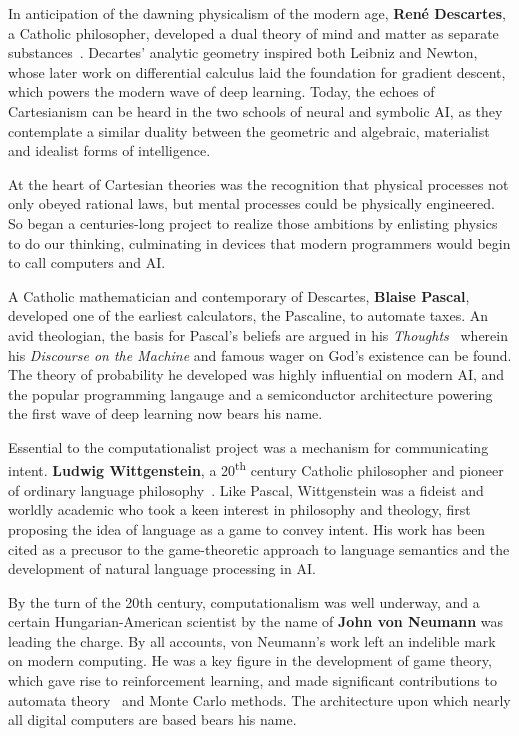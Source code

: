 \documentclass[sigplan,nonacm]{acmart}\settopmatter{printfolios=false,printccs=false,printacmref=false}
\begin{document}
  In anticipation of the dawning physicalism of the modern age, \textbf{Ren\'e Descartes}, a Catholic philosopher, developed a dual theory of mind and matter as separate substances~\cite{descartes1641meditationes}. Decartes' analytic geometry inspired both Leibniz and Newton, whose later work on differential calculus laid the foundation for gradient descent, which powers the modern wave of deep learning. Today, the echoes of Cartesianism can be heard in the two schools of neural and symbolic AI, as they contemplate a similar duality between the geometric and algebraic, materialist and idealist forms of intelligence.

  At the heart of Cartesian theories was the recognition that physical processes not only obeyed rational laws, but mental processes could be physically engineered. So began a centuries-long project to realize those ambitions by enlisting physics to do our thinking, culminating in devices that modern programmers would begin to call computers and AI.

  A Catholic mathematician and contemporary of Descartes, \textbf{Blaise Pascal}, developed one of the earliest calculators, the Pascaline, to automate taxes. An avid theologian, the basis for Pascal's beliefs are argued in his \textit{Thoughts}~\cite{pascal1670pensees} wherein his \textit{Discourse on the Machine} and famous wager on God's existence can be found. The theory of probability he developed was highly influential on modern AI, and the popular programming langauge and a semiconductor architecture powering the first wave of deep learning now bears his name.

  Essential to the computationalist project was a mechanism for communicating intent. \textbf{Ludwig Wittgenstein}, a 20\textsuperscript{th} century Catholic philosopher and pioneer of ordinary language philosophy~\cite{wittgenstein1929some}. Like Pascal, Wittgenstein was a fideist and worldly academic who took a keen interest in philosophy and theology, first proposing the idea of language as a game to convey intent. His work has been cited as a precusor to the game-theoretic approach to language semantics and the development of natural language processing in AI.

   By the turn of the 20th century, computationalism was well underway, and a certain Hungarian-American scientist by the name of \textbf{John von Neumann} was leading the charge. By all accounts, von Neumann's work left an indelible mark on modern computing. He was a key figure in the development of game theory, which gave rise to reinforcement learning, and made significant contributions to automata theory~\cite{von2017general} and Monte Carlo methods. The architecture upon which nearly all digital computers are based bears his name.
\end{document}
